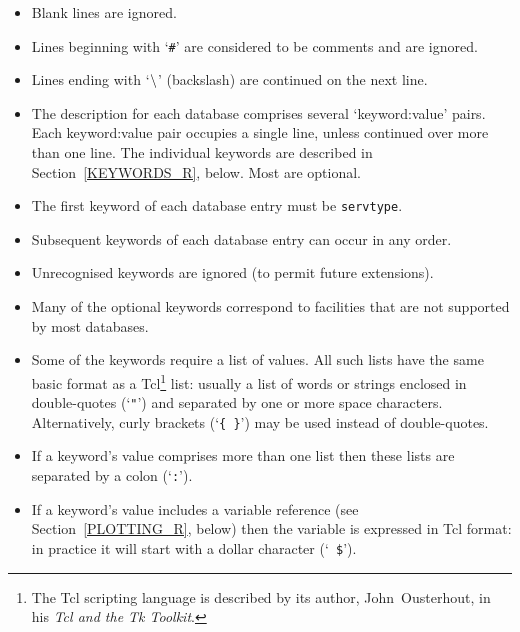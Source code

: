 \documentclass[twoside,11pt]{article}
\renewcommand{\_}{\texttt{\symbol{95}}}
\begin{document}
\begin{itemize}

  \item Blank lines are ignored.

  \item Lines beginning with `{\tt \#}' are considered to be comments
   and are ignored.

  \item Lines ending with `${\tt \backslash}$' (backslash) are continued
   on the next line.

  \item The description for each database comprises several `keyword:value'
   pairs.  Each keyword:value pair occupies a single line, unless continued
   over more than one line.  The individual keywords are described in
   Section~\ref{KEYWORDS_R}, below.  Most are optional.

  \item The first keyword of each database entry must be {\tt serv\_type}.

  \item Subsequent keywords of each database entry can occur in any
   order.

  \item Unrecognised keywords are ignored (to permit future extensions).

  \item Many of the optional keywords correspond to facilities that are not
   supported by most databases.

  \item Some of the keywords require a list of values.  All such lists
   have the same basic format as a Tcl\footnote{The Tcl scripting language
   is described by its author, John~Ousterhout, in his {\it Tcl and the Tk
   Toolkit}\/\cite{OUSTERHOUT94}.} list: usually a list of words
   or strings enclosed in double-quotes (`{\tt "}') and separated by one
   or more space characters.  Alternatively, curly brackets (`{\tt \{ \}}')
   may be used instead of double-quotes.

  \item If a keyword's value comprises more than one list then these
   lists are separated by a colon (`{\tt :}').

  \item If a keyword's value includes a variable reference (see
   Section~\ref{PLOTTING_R}, below) then the variable is expressed in
   Tcl format: in practice it will start with a dollar character (`{\tt
   \$}').

\end{itemize}
\end{document}
